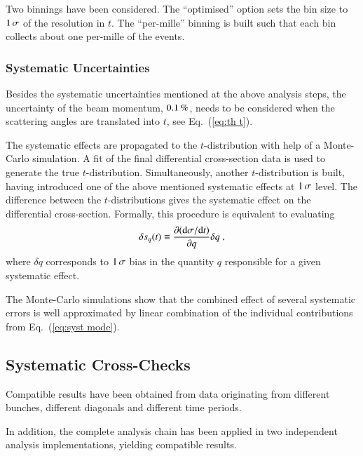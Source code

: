 Two binnings have been considered. The ``optimised'' option sets the bin size to $1\,{\rm \sigma}$ of the resolution in $t$. The ``per-mille'' binning is built such that each bin collects about one per-mille of the events.



\subsubsection{Systematic Uncertainties}
\label{sec:systematics}

Besides the systematic uncertainties mentioned at the above analysis steps, the uncertainty of the beam momentum, $0.1\,{\rm \%}$, needs to be considered when the scattering angles are translated into $t$, see Eq.~(\ref{eq:th t}).

The systematic effects are propagated to the $t$-distribution with help of a Monte-Carlo simulation. A fit of the final differential cross-section data is used to generate the true $t$-distribution. Simultaneously, another $t$-distribution is built, having introduced one of the above mentioned systematic effects at $1\,{\rm \sigma}$ level. The difference between the $t$-distributions gives the systematic effect on the differential cross-section. Formally, this procedure is equivalent to evaluating
\begin{equation}
\label{eq:syst mode}
\delta s_{q}(t) \equiv \frac{\partial({\rm d}\sigma/{\rm d} t)}{\partial q} \delta q\ ,
\end{equation}
where $\delta q$ corresponds to $1\,{\rm \sigma}$ bias in the quantity $q$ responsible for a given systematic effect.

The Monte-Carlo simulations show that the combined effect of several systematic errors is well approximated by linear combination of the individual contributions from Eq.~(\ref{eq:syst mode}).



\subsection{Systematic Cross-Checks}
\label{sec:cross checks}

Compatible results have been obtained from data originating from different bunches, different diagonals and different time periods.

In addition, the complete analysis chain has been applied in two independent analysis implementations, yielding compatible results.

